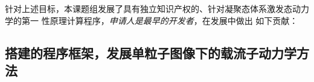 针对上述目标，本课题组发展了具有独立知识产权的、针对凝聚态体系激发态动力学的第一
性原理计算程序\hnamd{}，\emph{申请人是\hnamd{}最早的开发者}，在\hnamd{}发展中做出
如下贡献：





\subsection{搭建\hnamd{}的程序框架，发展单粒子图像下的载流子动力学方法}

